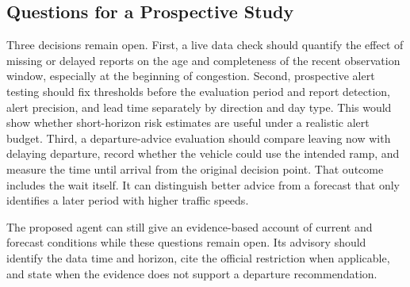 \subsection{Questions for a Prospective Study}
Three decisions remain open. First, a live data check should quantify the effect of missing or delayed reports on the age and completeness of the recent observation window, especially at the beginning of congestion. Second, prospective alert testing should fix thresholds before the evaluation period and report detection, alert precision, and lead time separately by direction and day type. This would show whether short-horizon risk estimates are useful under a realistic alert budget. Third, a departure-advice evaluation should compare leaving now with delaying departure, record whether the vehicle could use the intended ramp, and measure the time until arrival from the original decision point. That outcome includes the wait itself. It can distinguish better advice from a forecast that only identifies a later period with higher traffic speeds.

The proposed agent can still give an evidence-based account of current and forecast conditions while these questions remain open. Its advisory should identify the data time and horizon, cite the official restriction when applicable, and state when the evidence does not support a departure recommendation.
